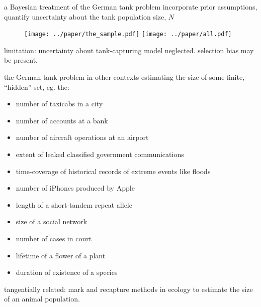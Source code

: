 \documentclass[10pt]{beamer}
\begin{document}
\begin{frame}[t]{a Bayesian treatment of the German tank problem}
	incorporate prior assumptions, quantify uncertainty about the tank population size, $N$
	
	\begin{figure}[h!]
		\centering
 		\texttt{[image: ../paper/the\_sample.pdf]}
 		\texttt{[image: ../paper/all.pdf]}
	\end{figure}
	
	\pause
	
	\alert{limitation}: uncertainty about tank-capturing model neglected. selection bias may be present.
\end{frame}

\begin{frame}[t]{the German tank problem in other contexts}
estimating the size of some finite, ``hidden'' set, eg. the:
\begin{itemize} 
\item number of taxicabs in a city 
\item number of accounts at a bank
\item  number of aircraft operations at an airport
\item  extent of leaked classified government communications
\item  time-coverage of historical records of extreme events like floods
\item  number of iPhones produced by Apple 
\item  length of a short-tandem repeat allele 
\item  size of a social network 
\item  number of cases in court 
\item  lifetime of a flower of a plant 
\item duration of existence of a species 
\end{itemize}

tangentially related: mark and recapture methods in ecology to estimate the size of an animal population. 
\end{frame}
\end{document}

